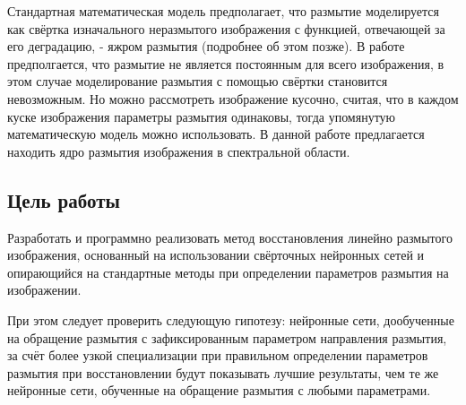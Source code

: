 Стандартная математическая модель предполагает, что размытие моделируется как свёртка изначального неразмытого изображения с функцией, отвечающей за его деградацию, - яжром размытия (подробнее об этом позже).
В работе предполгается, что размытие не является постоянным для всего изображения, в этом случае 
моделирование размытия с помощью свёртки становится невозможным. 
Но можно рассмотреть изображение кусочно, считая, что в каждом куске изображения параметры размытия одинаковы, тогда упомянутую математическую модель можно использовать.
В данной работе предлагается находить ядро размытия изображения в спектральной области. 
\par

\subsection{Цель работы}
Разработать и программно реализовать метод восстановления линейно размытого изображения, основанный на использовании свёрточных нейронных сетей и опирающийся на стандартные методы при определении параметров размытия на изображении.
\par
При этом следует проверить следующую гипотезу: нейронные сети, дообученные на обращение размытия с зафиксированным параметром направления размытия, за счёт более узкой специализации при правильном определении параметров размытия при восстановлении будут показывать лучшие результаты, чем те же нейронные сети, обученные на обращение размытия с любыми параметрами.

